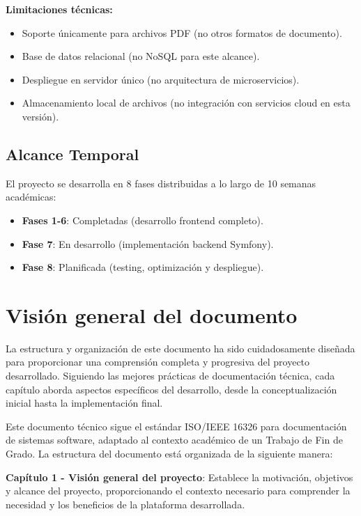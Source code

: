 \documentclass[12pt,a4paper,oneside]{report}
\providecommand{\tightlist}{%
  \setlength{\itemsep}{0pt}\setlength{\parskip}{0pt}}
\begin{document}
\textbf{Limitaciones técnicas:}

\begin{itemize}
\tightlist
\item
  Soporte únicamente para archivos PDF (no otros formatos de documento).
\item
  Base de datos relacional (no NoSQL para este alcance).
\item
  Despliegue en servidor único (no arquitectura de microservicios).
\item
  Almacenamiento local de archivos (no integración con servicios cloud
  en esta versión).
\end{itemize}

\subsection{Alcance Temporal}\label{alcance-temporal}

El proyecto se desarrolla en 8 fases distribuidas a lo largo de 10
semanas académicas:

\begin{itemize}
\tightlist
\item
  \textbf{Fases 1-6}: Completadas (desarrollo frontend completo).
\item
  \textbf{Fase 7}: En desarrollo (implementación backend Symfony).
\item
  \textbf{Fase 8}: Planificada (testing, optimización y despliegue).
\end{itemize}

\section{Visión general del
documento}\label{visiuxf3n-general-del-documento}

La estructura y organización de este documento ha sido cuidadosamente
diseñada para proporcionar una comprensión completa y progresiva del
proyecto desarrollado. Siguiendo las mejores prácticas de documentación
técnica, cada capítulo aborda aspectos específicos del desarrollo, desde
la conceptualización inicial hasta la implementación final.

Este documento técnico sigue el estándar ISO/IEEE 16326 para
documentación de sistemas software, adaptado al contexto académico de un
Trabajo de Fin de Grado. La estructura del documento está organizada de
la siguiente manera:

\textbf{Capítulo 1 - Visión general del proyecto}: Establece la
motivación, objetivos y alcance del proyecto, proporcionando el contexto
necesario para comprender la necesidad y los beneficios de la plataforma
desarrollada.
\end{document}
